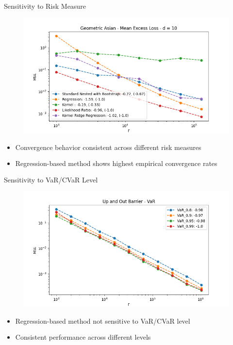 \documentclass[9pt,handout]{beamer}
\begin{document}
\begin{frame}{Sensitivity to Risk Measure}

\begin{figure}
    \includegraphics[width=\textwidth]{../project1/figures/figure8a.png}
\end{figure}

\begin{itemize}
    \item Convergence behavior consistent across different risk measures
    \item Regression-based method shows highest empirical convergence rates
\end{itemize}

\end{frame}

\begin{frame}{Sensitivity to VaR/CVaR Level}

\begin{figure}
    \includegraphics[width=\textwidth]{../project1/figures/figure9a.png}
\end{figure}

\begin{itemize}
    \item Regression-based method not sensitive to VaR/CVaR level
    \item Consistent performance across different levels
\end{itemize}

\end{frame}
\end{document}
